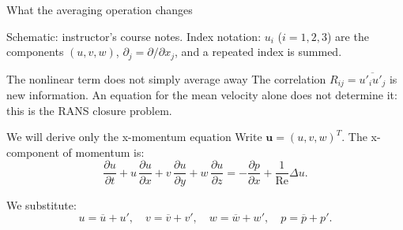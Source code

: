 \documentclass[aspectratio=169,11pt]{beamer}
\newcommand{\uu}{\bm{u}}
\newcommand{\Rey}{\mathrm{Re}}
\newcommand{\avg}[1]{\overline{#1}}
\newcommand{\Lap}{\Delta}
\begin{document}
\begin{frame}{What the averaging operation changes}
\centering
{}

\vspace{0.4em}
{\scriptsize\color{DarkGray} Schematic: instructor's course notes. Index notation: $u_i$ ($i=1,2,3$) are the components $(u,v,w)$, $\partial_j=\partial/\partial x_j$, and a repeated index is summed.\par}

\vspace{0.7em}
\begin{block}{The nonlinear term does not simply average away}
The correlation $R_{ij}=\overline{u'_i u'_j}$ is new information. An equation for the mean velocity alone does not determine it: this is the RANS closure problem.
\end{block}
\end{frame}

\begin{frame}{We will derive only the x-momentum equation}
Write $\uu=(u,v,w)^T$. The x-component of momentum is:
\[
\frac{\partial u}{\partial t} + u\,\frac{\partial u}{\partial x} + v\,\frac{\partial u}{\partial y} + w\,\frac{\partial u}{\partial z}
= -\frac{\partial p}{\partial x} + \frac{1}{\Rey}\Lap u.
\]

We substitute:
\[
u=\avg{u}+u',\quad v=\avg{v}+v',\quad w=\avg{w}+w',\quad p=\avg{p}+p'.
\]
\end{frame}
\end{document}
